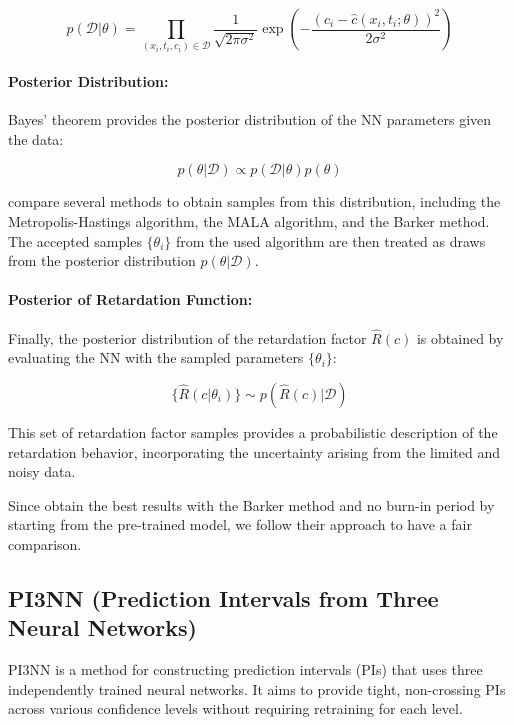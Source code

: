 \begin{equation}
p(\mathcal{D} | \theta) = \prod_{(x_i, t_i, c_i) \in \mathcal{D}} \frac{1}{\sqrt{2\pi \sigma^2}} \exp \left( -\frac{(c_i - \hat{c}(x_i, t_i; \theta))^2}{2\sigma^2} \right)
\label{eq:likelihood}
\end{equation}

\paragraph{Posterior Distribution:}

Bayes' theorem provides the posterior distribution of the NN parameters given the data:

\begin{equation*}
p(\theta | \mathcal{D}) \propto p(\mathcal{D} | \theta) p(\theta)
\end{equation*}

\cite{finn} compare several methods to obtain samples from this distribution, including the Metropolis-Hastings algorithm, the MALA algorithm, and the Barker method. The accepted samples $\{\theta_i\}$ from the used algorithm are then treated as draws from the posterior distribution $p(\theta | \mathcal{D})$.

\paragraph{Posterior of Retardation Function:}

Finally, the posterior distribution of the retardation factor $\hat{R}(c)$ is obtained by evaluating the NN with the sampled parameters $\{\theta_i\}$:

\begin{equation*}
\{\hat{R}(c | \theta_i)\} \sim p(\hat{R}(c) | \mathcal{D})
\end{equation*}

This set of retardation factor samples provides a probabilistic description of the retardation behavior, incorporating the uncertainty arising from the limited and noisy data.

Since \cite{finn} obtain the best results with the Barker method and no burn-in period by starting from the pre-trained model, we follow their approach to have a fair comparison.




\subsection{PI3NN (Prediction Intervals from Three Neural Networks)}
PI3NN \cite{pi3nn} is a method for constructing prediction intervals (PIs) that uses three independently trained neural networks. It aims to provide tight, non-crossing PIs across various confidence levels without requiring retraining for each level.

